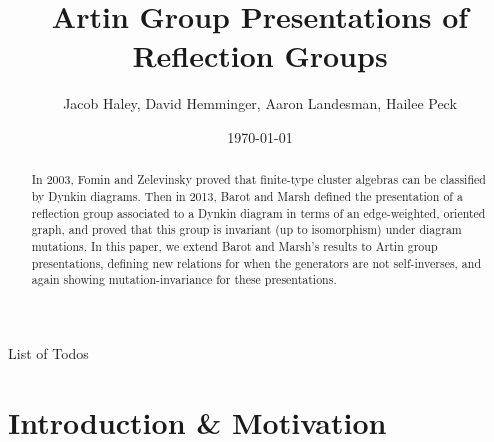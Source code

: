 \documentclass[11pt]{amsart}
\makeatletter
\theoremstyle{definition}
\def\listtodoname{List of Todos}
\def\listoftodos{\@starttoc{tdo}\listtodoname}
\makeatother
\begin{document}
\listoftodos




\title{Artin Group Presentations of Reflection Groups}
\author{Jacob Haley, David Hemminger, Aaron Landesman, Hailee Peck}
\address{you can put addresses for authors\\
here \\
}
\date{\today}

\begin{abstract}
In 2003, Fomin and Zelevinsky proved that finite-type cluster algebras can be classified by Dynkin diagrams. Then in 2013, Barot and Marsh defined the presentation of a reflection group associated to a Dynkin diagram in terms of an edge-weighted, oriented graph, and proved that this group is invariant (up to isomorphism) under diagram mutations. In this paper, we extend Barot and Marsh's results to Artin group presentations, defining new relations for when the generators are not self-inverses, and again showing mutation-invariance for these presentations.
\end{abstract}

\maketitle

\section{Introduction \& Motivation}
\label{sec:Intro}
\end{document}
